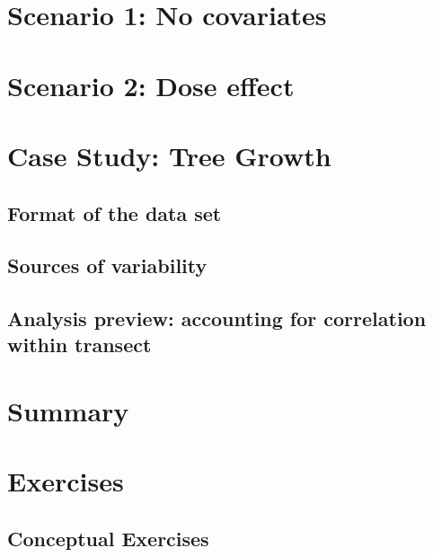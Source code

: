 \documentclass[
]{krantz}
\begin{document}
\hypertarget{scenario-1-no-covariates}{%
\section{Scenario 1: No covariates}\label{scenario-1-no-covariates}}

\hypertarget{scenario-2-dose-effect}{%
\section{Scenario 2: Dose effect}\label{scenario-2-dose-effect}}

\hypertarget{case-study-tree-growth}{%
\section{Case Study: Tree Growth}\label{case-study-tree-growth}}

\hypertarget{format-of-the-data-set}{%
\subsection{Format of the data set}\label{format-of-the-data-set}}

\hypertarget{sources-of-variability-1}{%
\subsection{Sources of variability}\label{sources-of-variability-1}}

\hypertarget{analysis-preview-accounting-for-correlation-within-transect}{%
\subsection{Analysis preview: accounting for correlation within transect}\label{analysis-preview-accounting-for-correlation-within-transect}}

\hypertarget{summary-2}{%
\section{Summary}\label{summary-2}}

\hypertarget{exercises-6}{%
\section{Exercises}\label{exercises-6}}

\hypertarget{conceptual-exercises-4}{%
\subsection{Conceptual Exercises}\label{conceptual-exercises-4}}
\end{document}

